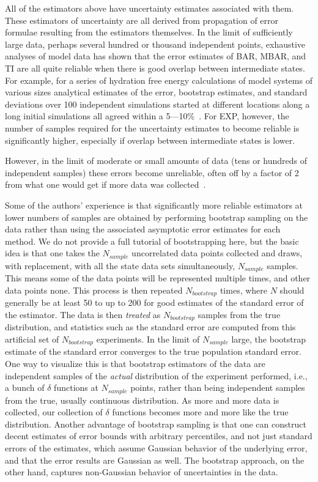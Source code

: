 All of the estimators above have uncertainty estimates associated with them. These estimators of uncertainty are all derived from propagation of error formulae resulting from the estimators themselves.  In the limit of sufficiently large data, perhaps several hundred or thousand independent points, exhaustive analyses of model data has shown that the error estimates of BAR, MBAR, and TI are all quite reliable when there is good overlap between intermediate states. For example, for a series of hydration free energy calculations of model systems of various sizes analytical estimates of the error, bootstrap estimates, and standard deviations over 100 independent simulations started at different locations along a long initial simulations all agreed within a 5---10\%~\cite{paliwal2011benchmark}. For EXP, however, the number of samples required for the uncertainty estimates to become reliable is significantly higher, especially if overlap between intermediate states is lower. 

However, in the limit of moderate or small amounts of data (tens or hundreds of independent samples) these errors become unreliable, often off by a factor of 2 from what one would get if more data was collected~\cite{???}. 

Some of the authors' experience is that significantly more reliable estimators at lower numbers of samples are obtained by performing bootstrap sampling on the data rather than using the associated asymptotic error estimates for each method. We do not provide a full tutorial of bootstrapping here, but the basic idea is that one takes the $N_{sample}$ uncorrelated data points collected and draws, with replacement, with all the state data sets simultaneously, $N_{sample}$ samples.  This means some of the data points will be represented multiple times, and other data points none. This process is then repeated $N_{bootstrap}$ times, where $N$ should generally be at least 50 to up to 200 for good estimates of the standard error of the estimator.  The data is then \textit{treated} as $N_{bootstrap}$ samples from the true distribution, and statistics such as the standard error are computed from this artificial set of $N_{bootstrap}$ experiments.  In the limit of $N_{sample}$ large, the bootstrap estimate of the standard error converges to the true population standard error.  One way to visualize this is that bootstrap estimators of the data are independent samples of the \textit{actual} distribution of the experiment performed, i.e., a bunch of $\delta$ functions at $N_{sample}$ points, rather than being independent samples from the true, usually continuous distribution.  As more and more data is collected, our collection of $\delta$ functions becomes more and more like the true distribution. Another advantage of bootstrap sampling is that one can construct decent estimates of error bounds with arbitrary percentiles, and not just standard errors of the estimates, which assume Gaussian behavior of the underlying error, and that the error results are Gaussian as well.  The bootstrap approach, on the other hand, captures non-Gaussian behavior of uncertainties in the data. 

